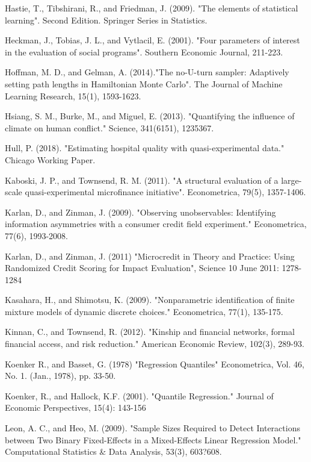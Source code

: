 \documentclass[english,12pt]{article}\usepackage{lmodern}
\numberwithin{equation}{section}
\begin{document}
\begin{thebibliography}{99}
 Hastie, T., Tibshirani, R., and Friedman, J. (2009). "The elements of statistical learning". Second Edition. Springer Series in Statistics.

 Heckman, J., Tobias, J. L., and Vytlacil, E. (2001). "Four parameters of interest in the evaluation of social programs". Southern Economic Journal, 211-223.

 Hoffman, M. D., and Gelman, A. (2014)."The no-U-turn sampler: Adaptively setting path lengths in Hamiltonian Monte Carlo". The Journal of Machine Learning Research, 15(1), 1593-1623.

 Hsiang, S. M., Burke, M., and Miguel, E. (2013). "Quantifying the influence of climate on human conflict." Science, 341(6151), 1235367.

 Hull, P. (2018). "Estimating hospital quality with quasi-experimental data." Chicago Working Paper.

 Kaboski, J. P., and Townsend, R. M. (2011). "A structural evaluation of a large-scale quasi-experimental microfinance initiative". Econometrica, 79(5), 1357-1406.

 Karlan, D., and Zinman, J. (2009). "Observing unobservables: Identifying information asymmetries with a consumer credit field experiment." Econometrica, 77(6), 1993-2008.

  Karlan, D., and Zinman, J. (2011) "Microcredit in Theory and Practice: Using Randomized Credit Scoring for Impact Evaluation", Science 10 June 2011: 1278-1284
 
  Kasahara, H., and Shimotsu, K. (2009). "Nonparametric identification of finite mixture models of dynamic discrete choices." Econometrica, 77(1), 135-175.
 
 Kinnan, C., and Townsend, R. (2012). "Kinship and financial networks, formal financial access, and risk reduction." American Economic Review, 102(3), 289-93.

 Koenker R., and Basset, G. (1978) "Regression Quantiles"  Econometrica, Vol. 46, No. 1. (Jan., 1978), pp. 33-50.

 Koenker, R., and Hallock, K.F. (2001). "Quantile Regression." Journal of Economic Perspectives, 15(4): 143-156

 Leon, A. C., and Heo, M. (2009). "Sample Sizes Required to Detect Interactions between Two Binary Fixed-Effects in a Mixed-Effects Linear Regression Model." Computational Statistics \& Data Analysis, 53(3), 603?608.


\end{thebibliography}
\end{document}
